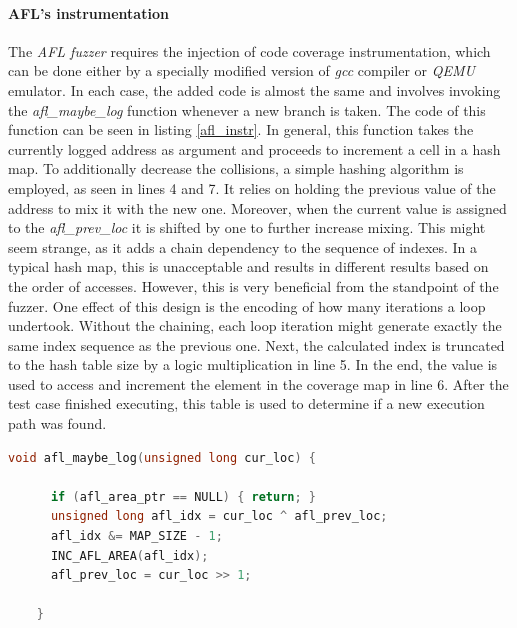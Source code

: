 \paragraph{AFL's instrumentation}
The \textit{AFL fuzzer} requires the injection of code coverage instrumentation, which can be done either by a specially modified version of \textit{gcc} compiler or \textit{QEMU} emulator. In each case, the added code is almost the same and involves invoking the \textit{afl\_maybe\_log} function whenever a new branch is taken. The code of this function can be seen in listing \ref{afl_instr}. In general, this function takes the currently logged address as argument and proceeds to increment a cell in a hash map. To additionally decrease the collisions, a simple hashing algorithm is employed, as seen in lines 4 and 7. It relies on holding the previous value of the address to mix it with the new one. Moreover, when the current value is assigned to the \textit{afl\_prev\_loc} it is shifted by one to further increase mixing. This might seem strange, as it adds a chain dependency to the sequence of indexes. In a typical hash map, this is unacceptable and results in different results based on the order of accesses. However, this is very beneficial from the standpoint of the fuzzer. One effect of this design is the encoding of how many iterations a loop undertook. Without the chaining, each loop iteration might generate exactly the same index sequence as the previous one. Next, the calculated index is truncated to the hash table size by a logic multiplication in line 5. In the end, the value is used to access and increment the element in the coverage map in line 6. After the test case finished executing, this table is used to determine if a new execution path was found.

\begin{minipage}\linewidth
    \begin{lstlisting}[language=C,caption={Instrumentation code from AFLPlusPlus fuzzer from \cite{aflpprepo}.},captionpos=b,label={afl_instr}]
    void afl_maybe_log(unsigned long cur_loc) {
    
      if (afl_area_ptr == NULL) { return; }
      unsigned long afl_idx = cur_loc ^ afl_prev_loc;
      afl_idx &= MAP_SIZE - 1;
      INC_AFL_AREA(afl_idx);
      afl_prev_loc = cur_loc >> 1;
    
    }
    \end{lstlisting}
\end{minipage}

